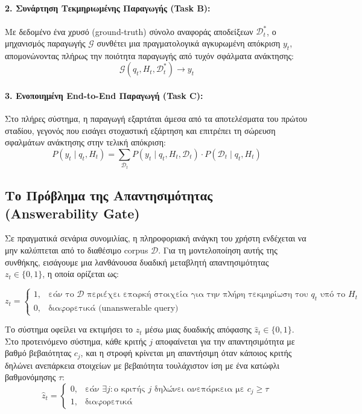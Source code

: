 \paragraph{2. Συνάρτηση Τεκμηριωμένης Παραγωγής (Task B):}
Με δεδομένο ένα χρυσό (ground-truth) σύνολο αναφοράς αποδείξεων $\mathcal{D}_t^*$, ο μηχανισμός παραγωγής $\mathcal{G}$ συνθέτει μια πραγματολογικά αγκυρωμένη απόκριση $y_t$, απομονώνοντας πλήρως την ποιότητα παραγωγής από τυχόν σφάλματα ανάκτησης:
\begin{equation}
\mathcal{G}(q_t, H_t, \mathcal{D}_t^*) \rightarrow y_t
\end{equation}

\paragraph{3. Ενοποιημένη End-to-End Παραγωγή (Task C):}
Στο πλήρες σύστημα, η παραγωγή εξαρτάται άμεσα από τα αποτελέσματα του πρώτου σταδίου, γεγονός που εισάγει στοχαστική εξάρτηση και επιτρέπει τη σώρευση σφαλμάτων ανάκτησης στην τελική απόκριση:
\begin{equation}
P(y_t \mid q_t, H_t) = \sum_{\mathcal{D}_t} P(y_t \mid q_t, H_t, \mathcal{D}_t) \cdot P(\mathcal{D}_t \mid q_t, H_t)
\end{equation}

\subsection{Το Πρόβλημα της Απαντησιμότητας (Answerability Gate)}

Σε πραγματικά σενάρια συνομιλίας, η πληροφοριακή ανάγκη του χρήστη ενδέχεται να μην καλύπτεται από το διαθέσιμο corpus $\mathcal{D}$. Για τη μοντελοποίηση αυτής της συνθήκης, εισάγουμε μια λανθάνουσα δυαδική μεταβλητή απαντησιμότητας $z_t \in \{0, 1\}$, η οποία ορίζεται ως:

\begin{equation}
z_t =
\begin{cases}
1, & \text{εάν το } \mathcal{D} \text{ περιέχει επαρκή στοιχεία για την πλήρη τεκμηρίωση του } q_t \text{ υπό το } H_t \\
0, & \text{διαφορετικά (unanswerable query)}
\end{cases}
\end{equation}

Το σύστημα οφείλει να εκτιμήσει το $z_t$ μέσω μιας δυαδικής απόφασης $\hat{z}_t \in \{0,1\}$. Στο προτεινόμενο σύστημα, κάθε κριτής $j$ αποφαίνεται για την απαντησιμότητα με βαθμό βεβαιότητας $c_j$, και η στροφή κρίνεται μη απαντήσιμη όταν κάποιος κριτής δηλώνει ανεπάρκεια στοιχείων με βεβαιότητα τουλάχιστον ίση με ένα κατώφλι βαθμονόμησης $\tau$:
\begin{equation}
\hat{z}_t =
\begin{cases}
0, & \text{εάν } \exists j: \text{ο κριτής } j \text{ δηλώνει ανεπάρκεια με } c_j \geq \tau \\
1, & \text{διαφορετικά}
\end{cases}
\end{equation}

